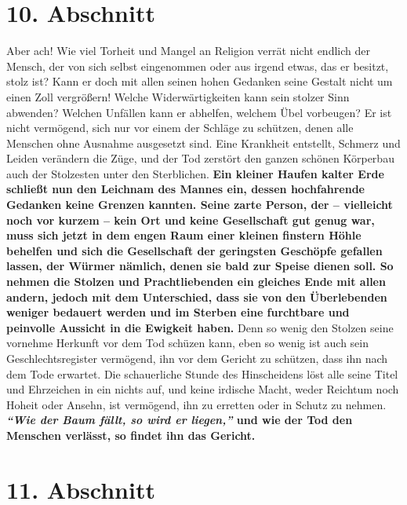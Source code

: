 \section{10. Abschnitt} \label{kap12_ab10}

Aber ach! Wie viel Torheit und Mangel an Religion verrät nicht endlich der
Mensch, der von sich selbst eingenommen oder aus irgend etwas, das er besitzt,
stolz ist? Kann er doch mit allen seinen hohen Gedanken seine Gestalt nicht um
einen Zoll vergrößern! Welche Widerwärtigkeiten kann sein stolzer Sinn abwenden?
Welchen Unfällen kann er abhelfen, welchem Übel vorbeugen? Er ist nicht
vermögend, sich nur vor einem der Schläge zu schützen, denen alle Menschen ohne
Ausnahme ausgesetzt sind.
Eine Krankheit entstellt,
Schmerz und Leiden
verändern die Züge, und der Tod zerstört den ganzen schönen Körperbau auch der
Stolzesten unter den Sterblichen.
\label{ref:12_10_eitle_menschen_tod}
\textbf{Ein kleiner Haufen kalter Erde schließt nun
den Leichnam des Mannes ein, dessen hochfahrende Gedanken keine Grenzen kannten.
Seine zarte Person, der -- vielleicht noch vor kurzem -- kein Ort und keine
Gesellschaft gut genug war, muss sich jetzt in dem engen Raum einer kleinen
finstern Höhle behelfen und sich die Gesellschaft der geringsten Geschöpfe
gefallen lassen, der Würmer nämlich, denen sie bald zur Speise dienen soll. So
nehmen die Stolzen und Prachtliebenden ein gleiches Ende mit allen andern,
jedoch mit dem Unterschied, dass sie von den Überlebenden weniger
bedauert
werden und im Sterben eine furchtbare und peinvolle Aussicht in die Ewigkeit
haben.} Denn so wenig den Stolzen seine vornehme Herkunft vor dem Tod schüzen
kann, eben so wenig ist auch sein Geschlechtsregister vermögend, ihn vor dem
Gericht zu schützen, dass ihn nach dem Tode erwartet. Die schauerliche Stunde
des Hinscheidens löst alle seine Titel und Ehrzeichen in ein nichts auf, und
keine irdische Macht, weder Reichtum noch Hoheit oder Ansehn, ist vermögend,
ihn zu erretten oder in Schutz zu nehmen. \textbf{\textit{"`Wie der Baum fällt,
so wird er
liegen,"'} und wie der Tod den Menschen verlässt, so findet ihn das Gericht.}

\section{11. Abschnitt} \label{kap12_ab11}

